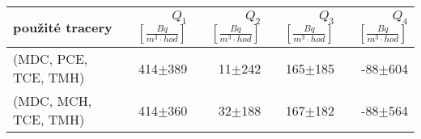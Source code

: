 \begin{tabular}{lrrrr}
\toprule
použité tracery & $Q_1$ $\left[\si{\frac{Bq}{m^3\cdot hod}}\right]$ & $Q_2$ $\left[\si{\frac{Bq}{m^3\cdot hod}}\right]$ & $Q_3$ $\left[\si{\frac{Bq}{m^3\cdot hod}}\right]$ & $Q_4$ $\left[\si{\frac{Bq}{m^3\cdot hod}}\right]$ \\
\midrule
(MDC, PCE, TCE, TMH) & 414$\pm$389 & 11$\pm$242 & 165$\pm$185 & -88$\pm$604 \\
(MDC, MCH, TCE, TMH) & 414$\pm$360 & 32$\pm$188 & 167$\pm$182 & -88$\pm$564 \\
\bottomrule
\end{tabular}
